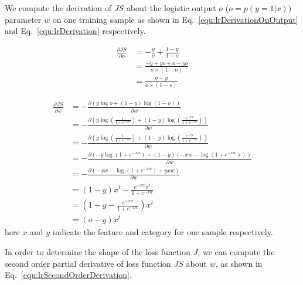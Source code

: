 \documentclass[runningheads,openany]{xhlPaper}
\begin{document}
We compute the derivation of $JS$ about the logistic output $o$ ($o = p\left( {{y} = 1|{x}}\right)$) parameter $w$ on one training sample as shown in Eq.~\ref{equ:lrDerivationOnOutput} and Eq.~\ref{equ:lrDerivation} respectively.

\begin{equation}
\label{equ:lrDerivationOnOutput}
\begin{aligned}
\frac{\partial JS}{\partial o}&=-\frac{y}{o}+\frac{1-y}{1-o}\\
&=\frac{-y+yo+o-yo}{o\times \left ( 1-o \right )}\\
&=\frac{o-y}{o\times \left ( 1-o \right )}
\end{aligned}
\end{equation}

\begin{equation}
\label{equ:lrDerivation}
\begin{aligned}
\frac{{\partial JS}}{{\partial w}} &=  - \frac{{\partial \left( {{y}\log o + \left( {1 - y} \right)\log \left( {1 - o} \right)} \right)}}{{\partial w}}\\
 &=  - \frac{{\partial \left( {y\log \left( {\frac{1}{{1 + {e^{ - xw}}}}} \right) + \left( {1 - y} \right)\log \left( {\frac{{{e^{ - xw}}}}{{1 + {e^{ - xw}}}}} \right)} \right)}}{{\partial w}}\\
 &=  - \frac{{\partial \left( {{y}\log \left( {\frac{1}{{1 + {e^{ - {x}w}}}}} \right) + \left( {1 - {y}} \right)\log \left( {\frac{{{e^{ - {x}w}}}}{{1 + {e^{ - {x}w}}}}} \right)} \right)}}{{\partial w}}\\
 &=  - \frac{{\partial \left( { - {y}\log \left( {1 + {e^{ - {x}w}}} \right) + \left( {1 - {y}} \right)\left( { - {x}w - \log \left( {1 + {e^{ - {x}w}}} \right)} \right)} \right)}}{{\partial w}}\\
 &=  - \frac{{\partial \left( { - {x}w - \log \left( {1 + {e^{ - {x}w}}} \right) + {y}{x}w} \right)}}{{\partial w}}\\
 &= \left( {1 - {y}} \right){{x} ^t} - \frac{{{e^{ - {x}w}}{{x} ^t}}}{{1 + {e^{ - {x}w}}}}\\
 &= \left( {1 - {y} - \frac{{{e^{ - {x}w}}}}{{1 + {e^{ - {x}w}}}}} \right){{x} ^t}\\
 &= \left( {o - {y}} \right){{x} ^t}
\end{aligned}
\end{equation}
here $x$ and $y$ indicate the feature and category for one sample respectively.

In order to determine the shape of the loss function $J$, we can compute the second order partial derivative of loss function $JS$ about $w$, as shown in Eq.~\ref{equ:lrSecondOrderDerivation}. 
\end{document}
